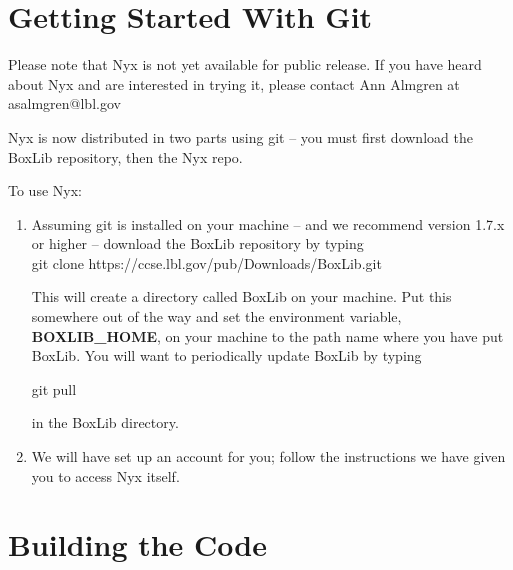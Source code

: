 \section{Getting Started With Git}

Please note that Nyx is not yet available for public release.  If you have
heard about Nyx and are interested in trying it, please contact Ann Almgren at
asalmgren@lbl.gov

Nyx is now distributed in two parts using git -- 
you must first download the BoxLib repository, then the Nyx repo.

To use Nyx:

\begin{enumerate}

\item Assuming git is installed on your machine -- and we recommend 
version 1.7.x or higher -- download the BoxLib repository by typing  \\

\noindent git clone https://ccse.lbl.gov/pub/Downloads/BoxLib.git

\noindent This will create a directory called BoxLib on your machine.  Put this somewhere out of the way and 
set the environment variable, {\bf BOXLIB\_HOME}, on your machine to the path name where
you have put BoxLib.    You will want to periodically update BoxLib by typing 

\noindent git pull

in the BoxLib directory.  

\item We will have set up an account for you; follow the instructions 
we have given you to access Nyx itself. 

\end{enumerate}

\clearpage

\section{Building the Code}


